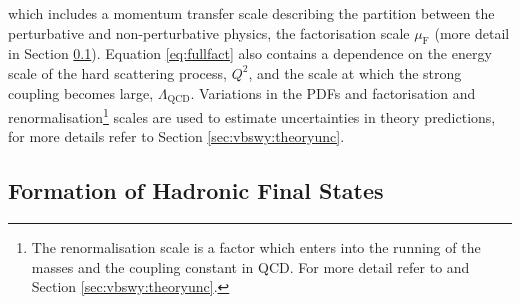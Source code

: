 which includes a momentum transfer scale describing the partition between the perturbative and non-perturbative physics, the factorisation scale $\mu_{\mathrm{F}}$ (more detail in Section \ref{sec:formhad}). Equation \ref {eq:fullfact} also contains a dependence on the energy scale of the hard scattering process, $Q^2$, and the scale at which the strong coupling becomes large, $\Lambda_{\text{QCD}}$. 
Variations in the PDFs and factorisation and renormalisation\footnote{The renormalisation scale is a factor which enters into the running of the masses and the coupling constant in QCD. For more detail refer to \cite{Buckley:PCP} and Section \ref{sec:vbswy:theoryunc}.} scales are used to estimate uncertainties in theory predictions, for more details refer to Section \ref{sec:vbswy:theoryunc}.

\subsection{Formation of Hadronic Final States}\label{sec:formhad}

